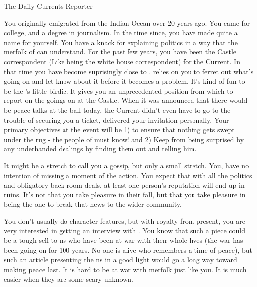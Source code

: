 \documentclass[char]{NeptuneBall}
\begin{document}
\name{\cReporter{}}


The Daily Currents Reporter

You originally emigrated from the Indian Ocean over 20 years ago. You came for college, and a degree in journalism. In the time since, you have made quite a name for yourself. You have a knack for explaining politics in a way that the merfolk of \pAtlantis{} can understand. For the past few years, you have been the Castle correspondent (Like being the white house correspondent) for the Current. In that time you have become suprisingly close to \cKing{\King} \cKing{}. \cKing{\They} relies on you to ferret out what's going on and let \cKing{\them} know about it before it becomes a problem. It's kind of fun to be the \cKing{\King}'s little birdie. It gives you an unprecedented position from which to report on the goings on at the Castle. When it was announced that there would be peace talks at the ball today, the Current didn't even have to go to the trouble of securing you a ticket, \cKing{\King} \cKing{} delivered your invitation personally.  Your primary objectives at the event will be 1) to ensure that nothing gets swept under the rug - the people of \pAtlantis{} must know! and 2) Keep \cKing{\King} \cKing{} from being surprised by any underhanded dealings by finding them out and telling him. 

It might be a stretch to call you a gossip, but only a small stretch. You, have no intention of missing a moment of the action. You expect that with all the politics and obligatory back room deals, at least one person’s reputation will end up in ruins. It's not that you take pleasure in their fall, but that you take pleasure in being the one to break that news to the wider community.

You don't usually do character features, but with royalty from \pPacifica{} present, you are very interested in getting an interview with \cPrince{\them}. You know that such a piece could be a tough sell to \pAtlantis{}ns who have been at war with \pPacifica{} their whole lives (the war has been going on for 100 years. No one is alive who remembers a time of peace), but such an article presenting the \pPacifica{}ns in a good light would go a long way toward making peace last. It is hard to be at war with merfolk just like you. It is much easier when they are some scary unknown.
\end{document}

